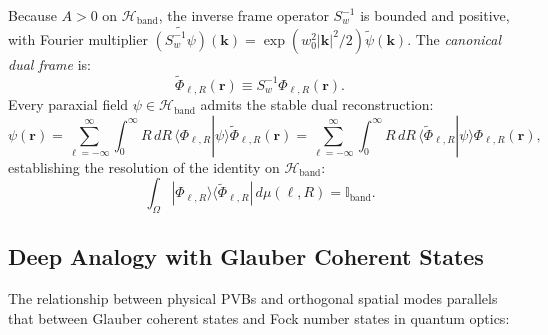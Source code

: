 \documentclass[11pt,a4paper]{article}
\begin{document}
Because $A > 0$ on $\mathcal{H}_{\text{band}}$, the inverse frame operator $S_w^{-1}$ is bounded and positive, with Fourier multiplier $\widetilde{(S_w^{-1} \psi)}(\mathbf{k}) = \exp(w_0^2 |\mathbf{k}|^2 / 2) \widetilde{\psi}(\mathbf{k})$. The \emph{canonical dual frame} is:
\begin{equation}
\widetilde{\Phi}_{\ell, R}(\mathbf{r}) \equiv S_w^{-1} \Phi_{\ell, R}(\mathbf{r}).
\end{equation}
Every paraxial field $\psi \in \mathcal{H}_{\text{band}}$ admits the stable dual reconstruction:
\begin{equation}
\boxed{\psi(\mathbf{r}) = \sum_{\ell=-\infty}^\infty \int_0^\infty R \, dR \, \langle \Phi_{\ell, R} | \psi \rangle \widetilde{\Phi}_{\ell, R}(\mathbf{r}) = \sum_{\ell=-\infty}^\infty \int_0^\infty R \, dR \, \langle \widetilde{\Phi}_{\ell, R} | \psi \rangle \Phi_{\ell, R}(\mathbf{r}),}
\label{eq:dual_expansion}
\end{equation}
establishing the resolution of the identity on $\mathcal{H}_{\text{band}}$:
\begin{equation}
\int_\Omega |\Phi_{\ell, R}\rangle \langle \widetilde{\Phi}_{\ell, R}| \, d\mu(\ell, R) = \mathbb{I}_{\text{band}}.
\end{equation}

\subsection{Deep Analogy with Glauber Coherent States}

The relationship between physical PVBs and orthogonal spatial modes parallels that between Glauber coherent states and Fock number states in quantum optics:
\end{document}

